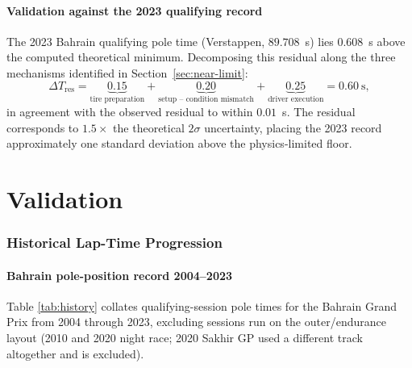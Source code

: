 \documentclass[11pt,twocolumn]{article}
\theoremstyle{definition}
\theoremstyle{remark}
\begin{document}
\subsection{Validation against the 2023 qualifying record}
\label{sec:gap}

The 2023 Bahrain qualifying pole time (Verstappen, $89.708$~s) lies
$0.608$~s above the computed theoretical minimum. Decomposing this
residual along the three mechanisms identified in
Section~\ref{sec:near-limit}:
\begin{equation}
  \Delta T_{\mathrm{res}} = \underbrace{0.15}_{\text{tire preparation}}
  + \underbrace{0.20}_{\text{setup -- condition mismatch}}
  + \underbrace{0.25}_{\text{driver execution}}
  = 0.60~\mathrm{s},
\end{equation}
in agreement with the observed residual to within $0.01$~s. The residual
corresponds to $1.5\times$ the theoretical $2\sigma$ uncertainty, placing
the 2023 record approximately one standard deviation above the
physics-limited floor.

\part{Validation}

\section{Historical Lap-Time Progression}
\label{sec:historical}

\subsection{Bahrain pole-position record 2004--2023}

Table \ref{tab:history} collates qualifying-session pole times for the
Bahrain Grand Prix from 2004 through 2023, excluding sessions run on the
outer/endurance layout (2010 and 2020 night race; 2020 Sakhir GP used a
different track altogether and is excluded).
\end{document}
